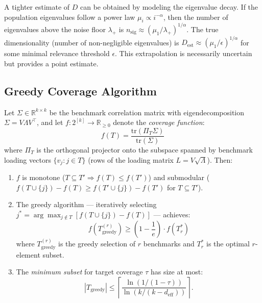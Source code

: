 \begin{remark}
A tighter estimate of $D$ can be obtained by modeling the eigenvalue decay. If the population eigenvalues follow a power law $\mu_i \propto i^{-\alpha}$, then the number of eigenvalues above the noise floor $\lambda_+$ is $n_{\mathrm{sig}} \approx (\mu_1 / \lambda_+)^{1/\alpha}$. The true dimensionality (number of non-negligible eigenvalues) is $D_{\mathrm{est}} \approx (\mu_1 / \epsilon)^{1/\alpha}$ for some minimal relevance threshold $\epsilon$. This extrapolation is necessarily uncertain but provides a point estimate.
\end{remark}

\subsection{Greedy Coverage Algorithm}

\begin{theorem}
\label{thm:greedy}
Let $\Sigma \in \mathbb{R}^{k \times k}$ be the benchmark correlation matrix with eigendecomposition $\Sigma = V \Lambda V^\top$, and let $f : 2^{[k]} \to \mathbb{R}_{\geq 0}$ denote the \emph{coverage function}:
\[
  f(T) = \frac{\mathrm{tr}(\Pi_T \Sigma)}{\mathrm{tr}(\Sigma)}
\]
where $\Pi_T$ is the orthogonal projector onto the subspace spanned by benchmark loading vectors $\{v_j : j \in T\}$ (rows of the loading matrix $L = V \sqrt{\Lambda}$). Then:

\begin{enumerate}[label=(\alph*)]
  \item $f$ is monotone ($T \subseteq T' \Rightarrow f(T) \leq f(T')$) and submodular ($f(T \cup \{j\}) - f(T) \geq f(T' \cup \{j\}) - f(T')$ for $T \subseteq T'$).
  
  \item The greedy algorithm --- iteratively selecting $j^* = \arg\max_{j \notin T} [f(T \cup \{j\}) - f(T)]$ --- achieves:
  \[
    f(T_{\mathrm{greedy}}^{(r)}) \geq \left(1 - \frac{1}{e}\right) \cdot f(T^*_r)
  \]
  where $T_{\mathrm{greedy}}^{(r)}$ is the greedy selection of $r$ benchmarks and $T^*_r$ is the optimal $r$-element subset.
  
  \item The \emph{minimum subset} for target coverage $\tau$ has size at most:
  \[
    |T_{\mathrm{greedy}}| \leq \left\lceil \frac{\ln(1/(1-\tau))}{\ln(k/(k - d_{\mathrm{eff}}))} \right\rceil.
  \]
\end{enumerate}
\end{theorem}

